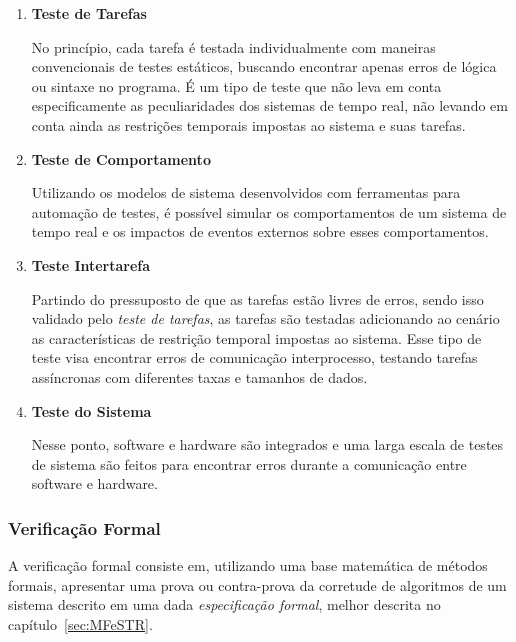 \begin{enumerate}
\item \textbf{Teste de Tarefas}

No princípio, cada tarefa é testada individualmente com maneiras convencionais de testes estáticos, buscando encontrar
apenas erros de lógica ou sintaxe no programa. É um tipo de teste que não leva em conta especificamente as peculiaridades
dos sistemas de tempo real, não levando em conta ainda as restrições temporais impostas ao sistema e suas tarefas.


\item \textbf{Teste de Comportamento}

Utilizando os modelos de sistema desenvolvidos com ferramentas para automação de testes, é possível simular os comportamentos
de um sistema de tempo real e os impactos de eventos externos sobre esses comportamentos.


\item \textbf{Teste Intertarefa}

Partindo do pressuposto de que as tarefas estão livres de erros, sendo isso validado pelo \textit{teste de tarefas}, as tarefas são
testadas adicionando ao cenário as características de restrição temporal impostas ao sistema. Esse tipo de teste visa encontrar
erros de comunicação interprocesso, testando tarefas assíncronas com diferentes taxas e tamanhos de dados.


\item \textbf{Teste do Sistema}

Nesse ponto, software e hardware são integrados e uma larga escala de testes de sistema são feitos para encontrar erros durante
a comunicação entre software e hardware.

\end{enumerate}

\subsubsection{Verificação Formal}
A verificação formal consiste em, utilizando uma base matemática de métodos formais, apresentar uma prova ou
contra-prova da corretude de algoritmos de um sistema descrito em uma dada \textit{especificação formal}, melhor
descrita no capítulo~\ref{sec:MFeSTR}.

